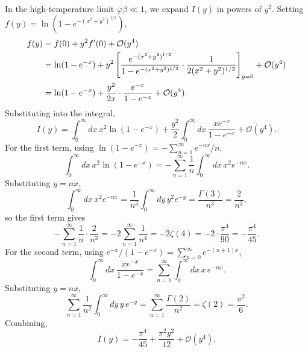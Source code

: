In the high-temperature limit $\bar\varphi\beta\ll 1$, we expand $I(y)$
in powers of $y^2$. Setting $f(y) = \ln(1-e^{-(x^2+y^2)^{1/2}})$,
\begin{align}
	f(y) & = f(0) + y^2 f'(0) + \mathcal{O}(y^4) \notag                       \\
	     & = \ln(1-e^{-x}) + y^2\left[\frac{e^{-(x^2+y^2)^{1/2}}}
		                            {1-e^{-(x^2+y^2)^{1/2}}}
		                            \cdot\frac{1}{2(x^2+y^2)^{1/2}}\right]_{y=0}
	+ \mathcal{O}(y^4) \notag                                                 \\
	     & = \ln(1-e^{-x})
	+ \frac{y^2}{2x}\cdot\frac{e^{-x}}{1-e^{-x}}
	+ \mathcal{O}(y^4).
\end{align}
Substituting into the integral,
\begin{equation}
	I(y) = \int_0^{\infty}dx\,x^2\ln(1-e^{-x})
	+ \frac{y^2}{2}\int_0^{\infty}dx\,
	\frac{xe^{-x}}{1-e^{-x}} + \mathcal{O}(y^4).
\end{equation}
For the first term, using $\ln(1-e^{-x})
	= -\sum_{n=1}^{\infty}e^{-nx}/n$,
\begin{equation}
	\int_0^{\infty}dx\,x^2\ln(1-e^{-x})
	= -\sum_{n=1}^{\infty}\frac{1}{n}
	\int_0^{\infty}dx\,x^2 e^{-nx}.
\end{equation}
Substituting $y = nx$,
\begin{equation}
	\int_0^{\infty}dx\,x^2 e^{-nx}
	= \frac{1}{n^3}\int_0^{\infty}dy\,y^2 e^{-y}
	= \frac{\Gamma(3)}{n^3} = \frac{2}{n^3},
\end{equation}
so the first term gives
\begin{equation}
	-\sum_{n=1}^{\infty}\frac{1}{n}\cdot\frac{2}{n^3}
	= -2\sum_{n=1}^{\infty}\frac{1}{n^4}
	= -2\zeta(4) = -2\cdot\frac{\pi^4}{90}
	= -\frac{\pi^4}{45}.
\end{equation}
For the second term, using $e^{-x}/(1-e^{-x})
	= \sum_{n=0}^{\infty}e^{-(n+1)x}$,
\begin{equation}
	\int_0^{\infty}dx\,\frac{xe^{-x}}{1-e^{-x}}
	= \sum_{n=1}^{\infty}\int_0^{\infty}dx\,x\,e^{-nx}.
\end{equation}
Substituting $y = nx$,
\begin{equation}
	\sum_{n=1}^{\infty}\frac{1}{n^2}
	\int_0^{\infty}dy\,y\,e^{-y}
	= \sum_{n=1}^{\infty}\frac{\Gamma(2)}{n^2}
	= \zeta(2) = \frac{\pi^2}{6}.
\end{equation}
Combining,
\begin{equation}
	\boxed{I(y) = -\frac{\pi^4}{45}
		+ \frac{\pi^2 y^2}{12} + \mathcal{O}(y^4).}
\end{equation}
